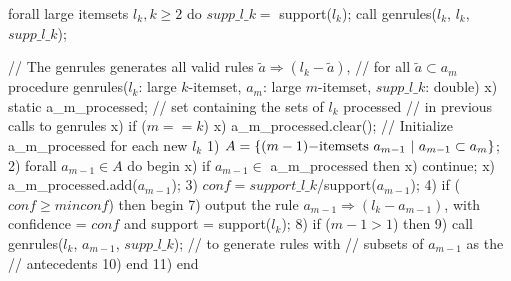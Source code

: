 forall large itemsets $l_k, k \geq 2$ do
  $supp\_l\_k =$ support($l_k$);
  call genrules($l_k$, $l_k$, $supp\_l\_k$);

// The genrules generates all valid rules $\tilde{a}\Rightarrow(l_k - \tilde{a})$,
// for all $\tilde{a} \subset a_m$
procedure genrules($l_k$: large $k$-itemset,
                   $a_m$: large $m$-itemset,
                   $supp\_l\_k$: double)
x)  static a_m_processed; // set containing the sets of $l_k$ processed
                          // in previous  calls to genrules
x)  if ($m == k$)
x)    a_m_processed.clear(); // Initialize a_m_processed for each new $l_k$
1)    $A = \{(m-1){\rm -itemsets}\  a_{m-1} \ | \ a_{m-1} \subset a_m\}$;
2)    forall $a_{m-1} \in A$ do begin
x)      if $a_{m-1} \in$ a_m_processed then
x)        continue;
x)      a_m_processed.add($a_{m-1}$);
3)      $conf = support\_l\_k$/support($a_{m-1}$);
4)      if ($conf \geq minconf$) then begin
7)        output the rule $a_{m-1} \Rightarrow (l_k - a_{m-1})$,
              with confidence = $conf$ 
                  and support = support($l_k$);
8)      if ($m - 1 > 1$) then
9)        call genrules($l_k$, $a_{m-1}$, $supp\_l\_k$); // to generate rules with
                                            // subsets of $a_{m-1}$ as the
                                            // antecedents
10)   end
11) end

